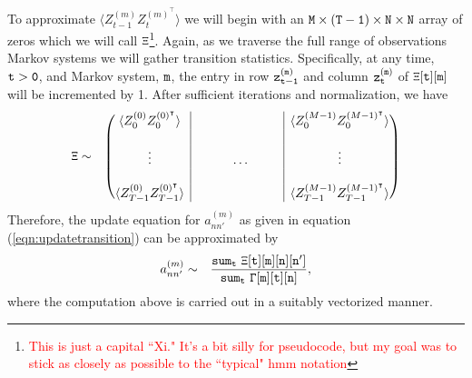 \documentclass{amsart}
\begin{document}
To approximate $\langle Z_{t-1}^{(m)}Z_{t}^{(m)^\intercal}\rangle$ we 
will begin with an ${\tt M\times (T-1) \times N\times N}$ array of zeros which we 
will call ${\tt \Xi}$\footnote{\textcolor{red}{This is just a capital 
``Xi."  It's a bit silly for pseudocode, but my goal was to stick as 
closely as possible to the ``typical" hmm notation}}.  Again, as we traverse 
the full range of observations Markov systems we will gather transition statistics.  
Specifically, at any time, ${\tt t>0}$, and Markov system, ${\tt m}$, 
the entry in row ${\tt z_{t-1}^{(m)}}$ and column ${\tt z_t^{(m)}}$ 
of ${\tt \Xi[t][m]}$ will be incremented by 1. After sufficient iterations and normalization, we have
\begin{eqnarray*}
{\tt \Xi} &\sim&
\left(\begin{array}{@{}c|c@{}|c@{}}
  \begin{matrix}
\langle Z_{0}^{(0)}Z_{0}^{(0)^\intercal}\rangle 
  \end{matrix}
  & 
  &
    \begin{matrix}
\langle Z_{0}^{(M-1)}Z_{0}^{(M-1)^\intercal}\rangle 
  \end{matrix}\\
  &&\\
  \vdots&\hspace{1cm}\hdots\hspace{1cm}&\vdots\\
  &&\\
  \begin{matrix}
\langle Z_{T-1}^{(0)}Z_{T-1}^{(0)^\intercal}\rangle 
  \end{matrix}
  & 
  &
    \begin{matrix}
\langle Z_{T-1}^{(M-1)}Z_{T-1}^{(M-1)^\intercal}\rangle 
  \end{matrix}
 \end{array}\right)
 \end{eqnarray*}
Therefore, the update equation for $a_{nn'}^{(m)}$ as given in 
equation (\ref{eqn:updatetransition}) can be approximated by 
\begin{eqnarray}\label{eqn:updatetransapprox}
a_{nn'}^{(m)}&\sim& \frac{{\tt sum_t\,\,\Xi[t][m][n][n']}}{{\tt 
sum_t\,\,\Gamma[m][t][n]}},
\end{eqnarray}
where the computation above is carried out in a suitably vectorized 
manner.
\end{document}
